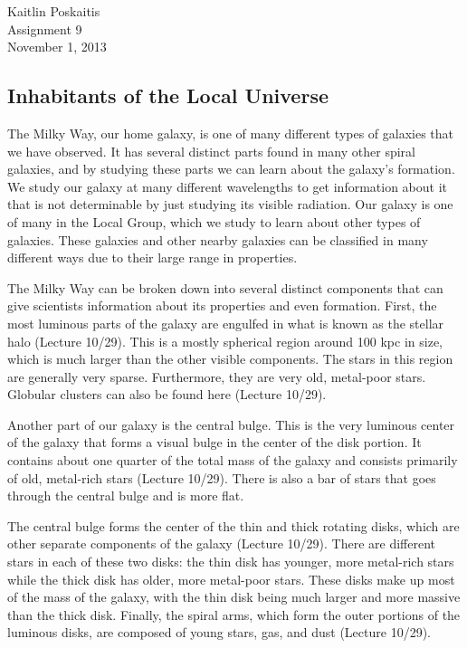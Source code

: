 \documentclass[12pt]{article}
\begin{document}
\noindent Kaitlin Poskaitis\\
Assignment 9\\
November 1, 2013
\begin{center}
    \section*{\bf Inhabitants of the Local Universe}
\end{center}

The Milky Way, our home galaxy, is one of many different types of galaxies that
we have observed.  It has several distinct parts found in many other spiral
galaxies, and by studying these parts we can learn about the galaxy's formation.
We study our galaxy at many different wavelengths to get information about it
that is not determinable by just studying its visible radiation.  Our galaxy is
one of many in the Local Group, which we study to learn about other types of
galaxies.  These galaxies and other nearby galaxies can be classified in many
different ways due to their large range in properties.

The Milky Way can be broken down into several distinct components that can give
scientists information about its properties and even formation.  First, the
most luminous parts of the galaxy are engulfed in what is known as the stellar
halo (Lecture 10/29).  This is a mostly spherical region around 100 kpc in size,
which is much
larger than the other visible components.  The stars in this region are
generally very sparse.  Furthermore, they are very old, metal-poor stars.
Globular clusters can also be found here (Lecture 10/29).

Another part of our galaxy is the central bulge. This is the very luminous
center of the galaxy that forms a visual bulge in the center of the disk
portion.  It contains about one quarter of the total mass of the galaxy and
consists primarily of old, metal-rich stars (Lecture 10/29).  There is also
a bar of stars that
goes through the central bulge and is more flat.

The central bulge forms the center of the thin
and thick rotating disks, which are other separate components of the galaxy
(Lecture 10/29).
There are different stars in each of these two disks: the thin disk has younger,
more metal-rich stars while the thick disk has older, more metal-poor stars.
These disks make up most of the mass of the galaxy, with the thin disk being
much larger and more massive than the thick disk.  Finally, the spiral arms,
which form the outer portions of the luminous disks,
are composed of young stars, gas, and dust (Lecture 10/29).
\end{document}
